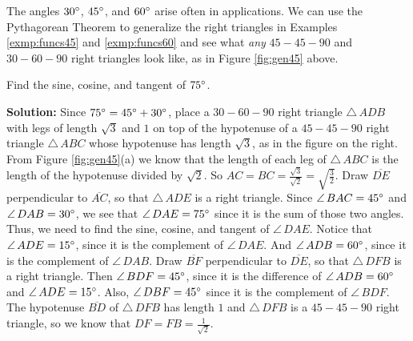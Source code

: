 The angles $30^\circ$, $45^\circ$, and $60^\circ$ arise often in applications. We can use the
Pythagorean Theorem to generalize the right triangles in
Examples \ref{exmp:funcs45} and \ref{exmp:funcs60} and see what \emph{any}
$45-45-90$ and $30-60-90$ right triangles look like, as in Figure \ref{fig:gen45} above.
\newpage
\begin{exmp}\label{exmp:funcs75}
\noindent Find the sine, cosine, and tangent of $75^\circ$.\vspace{1mm}
\par\noindent\textbf{Solution:} Since
$75^\circ = 45^\circ + 30^\circ$, place a $30-60-90$ right triangle $\triangle\,ADB$ with
legs of length $\sqrt{3}$ and $1$ on top of the hypotenuse of a $45-45-90$ right triangle
$\triangle\,ABC$ whose hypotenuse has length $\sqrt{3}$, as in the figure on the right.
From Figure \ref{fig:gen45}(a) we know that the length of each leg of $\triangle\,ABC$
is the length of the hypotenuse divided by $\sqrt{2}$. So $AC = BC = \frac{\sqrt{3}}{\sqrt{2}} =
\sqrt{\frac{3}{2}}$. Draw $\overline{DE}$ perpendicular to $\overline{AC}$, so that $\triangle\,ADE$
is a right triangle. Since $\angle\,BAC = 45^\circ$ and $\angle\,DAB = 30^\circ$, we see that
$\angle\,DAE = 75^\circ$ since it is the sum of those two angles. Thus, we need to find the sine,
cosine, and tangent of $\angle\,DAE$.
Notice that $\angle\,ADE = 15^\circ$, since it is the complement of $\angle\,DAE$. And
$\angle\,ADB = 60^\circ$, since it is the complement of $\angle\,DAB$. Draw
$\overline{BF}$ perpendicular to $\overline{DE}$, so that $\triangle\,DFB$ is a right triangle. Then
$\angle\,BDF = 45^\circ$, since it is the difference of $\angle\,ADB = 60^\circ$ and
$\angle\,ADE = 15^\circ$. Also, $\angle\,DBF = 45^\circ$ since it is the complement of
$\angle\,BDF$. The hypotenuse $\overline{BD}$ of $\triangle\,DFB$ has length $1$ and
$\triangle\,DFB$ is a $45-45-90$ right triangle, so we know that $DF = FB = \frac{1}{\sqrt{2}}$.


\end{exmp}
